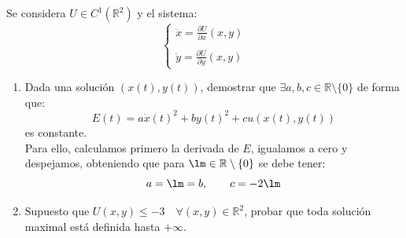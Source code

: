 \begin{ejercicio} %
    Se considera $U\in C^1(\mathbb{R}^2)$ y el sistema:
    \begin{equation*}
        \left\{\begin{array}{l}
                \ddot{x} = \frac{\partial U}{\partial x}(x,y) \\
                \\
                \ddot{y} = \frac{\partial U}{\partial y}(x,y) 
        \end{array}\right.
    \end{equation*}
    \begin{enumerate}[label=\alph*)]
        \item Dada una solución $(x(t),y(t))$, demostrar que $\exists a,b,c\in \mathbb{R}\setminus \{0\}$ de forma que:
            \begin{equation*}
                E(t) = a\dot{x}(t)^2 + by(t)^2 + cu(x(t),y(t))
            \end{equation*}
            es constante.\\

            \noindent
            Para ello, calculamos primero la derivada de $E$, igualamos a cero y despejamos, obteniendo que para $\lm\in \mathbb{R}\setminus \{0\}$ se debe tener:
            \begin{equation*}
                a = \lm = b, \qquad c = -2\lm
            \end{equation*}
        \item Supuesto que $U(x,y)\leq -3\quad \forall (x,y)\in \mathbb{R}^2$, probar que toda solución maximal está definida hasta $+\infty$.


\end{enumerate}
\end{ejercicio}
